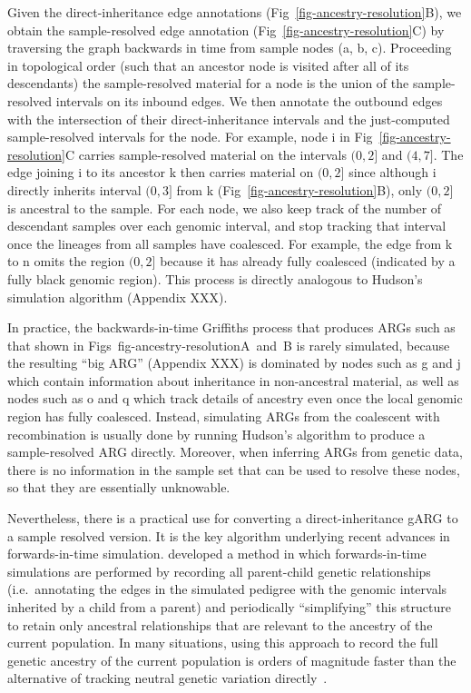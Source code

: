 \documentclass{article}
\begin{document}
Given the direct-inheritance edge annotations
(Fig~\ref{fig-ancestry-resolution}B),
 we obtain the sample-resolved edge annotation
(Fig~\ref{fig-ancestry-resolution}C) by traversing the graph backwards in time
from sample nodes (\textsf{a}, \textsf{b}, \textsf{c}).
Proceeding in topological order (such that an ancestor node is visited
after all of its descendants) the sample-resolved material for a node is the
union of the sample-resolved intervals on its inbound edges. We then annotate
the outbound edges with the intersection of their direct-inheritance intervals
and the just-computed sample-resolved intervals for the node.
For example, node \textsf{i} in Fig~\ref{fig-ancestry-resolution}C
carries sample-resolved material on the intervals $(0, 2]$ and $(4, 7]$. The edge
joining \textsf{i} to its ancestor \textsf{k} then carries
material on $(0, 2]$ since although \textsf{i} directly inherits interval
$(0, 3]$ from \textsf{k} (Fig~\ref{fig-ancestry-resolution}B), only $(0, 2]$ is
ancestral to the sample. For each node, we also keep track of the number of
descendant samples over each genomic interval, and stop tracking that
interval once the lineages from all samples have coalesced. For example,
the edge from \textsf{k} to \textsf{n} omits the region $(0,2]$ because it has
already fully coalesced (indicated by a fully black genomic region).
This process is directly analogous to Hudson's simulation algorithm
(Appendix XXX).

In practice, the backwards-in-time Griffiths process that produces
ARGs such as that shown in Figs~{fig-ancestry-resolution}A~and~B
is rarely simulated, because the resulting ``big ARG'' (Appendix XXX) is
dominated by nodes such as \textsf{g} and \textsf{j} which contain information
about inheritance in non-ancestral material, as well as nodes such as
\textsf{o} and \textsf{q} which track details of ancestry even once the
local genomic region has fully coalesced. Instead, simulating
ARGs from the coalescent with recombination is usually done by
running Hudson's algorithm to produce a sample-resolved ARG directly.
Moreover, when inferring ARGs from genetic data, there is no information
in the sample set that can be used to resolve these nodes, so that they
are essentially unknowable.

Nevertheless, there is a practical use for converting a direct-inheritance
gARG to a sample resolved version. It is the key algorithm underlying recent
advances in forwards-in-time simulation.
\cite{kelleher2018efficient} developed a method in which forwards-in-time
simulations are performed by recording all parent-child genetic relationships
(i.e.~annotating the edges in the simulated pedigree with the genomic
intervals inherited by a child from a parent) and periodically ``simplifying''
this structure to retain only ancestral relationships that are relevant
to the ancestry of the current population. In many situations, using this approach to
record the full genetic ancestry of the current population is orders of magnitude faster
than the alternative of tracking neutral genetic variation directly~\citep{kelleher2018efficient,haller2018tree}.
\end{document}
